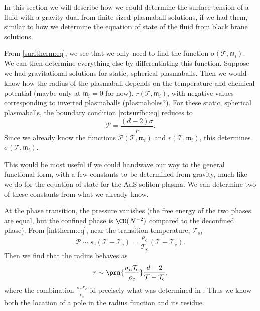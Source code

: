 \documentclass[12pt]{article}
\newcommand{\tloc}{\mathcal{T}}
\newcommand{\ploc}{\mathcal{P}}
\newcommand{\ml}{\mathfrak{m}}
\newcommand{\tc}{\mathcal{T_\mathrm{c}}}
\newcommand{\rc}{\rho_\mathrm{c}}
\newcommand{\ec}{s_\mathrm{c}}
\newcommand{\sic}{\sigma_\mathrm{c}}
\begin{document}
In this section we will describe how we could determine the surface tension of a fluid with a gravity dual from finite-sized plasmaball solutions, if we had them, similar to how we determine the equation of state of the fluid from black brane solutions.

From \eqref{surftherm:eq}, we see that we only need to find the function $\sigma(\tloc,\ml_i)$.
We can then determine everything else by differentiating this function.
Suppose we had gravitational solutions for static, spherical plasmaballs.
Then we would know how the radius of the plasmaball depends on the temperature and chemical potential (maybe only at $\ml_i=0$ for now), $r(\tloc,\ml_i)$, with negative values corresponding to inverted plasmaballs (plasmaholes?).
For these static, spherical plasmaballs, the boundary condition \eqref{rotsurfbc:eq} reduces to
%
\begin{equation}\label{eq:staticbc}
  \ploc = \frac{(d-2)\sigma}{r}.
\end{equation}
%
Since we already know the functions $\ploc(\tloc,\ml_i)$ and $r(\tloc,\ml_i)$, this determines $\sigma(\tloc,\ml_i)$.

This would be most useful if we could handwave our way to the general functional form, with a few constants to be determined from gravity, much like we do for the equation of state for the AdS-soliton plasma.
We can determine two of these constants from what we already know.

At the phase transition, the pressure vanishes (the free energy of the two phases are equal, but the confined phase is $\CO(N^{-2})$ compared to the deconfined phase).
From \eqref{inttherm:eq}, near the transition temperature, $\tc$,
%
\begin{equation}\label{eq:neartc}
  \ploc \sim \ec(\tloc-\tc) = \frac{\rc}{\tc}(\tloc-\tc).
\end{equation}
%
Then we find that the radius behaves as
%
\begin{equation}\label{eqradiustc}
  r \sim \prn{\frac{\sic\tc}{\rc}}\frac{d-2}{\tloc-\tc}, 
\end{equation}
%
where the combination $\frac{\sic\tc}{\rc}$ id precisely what was determined in \cite{Aharony:2005bm}.
Thus we know both the location of a pole in the radius function and its residue.



\end{document}
